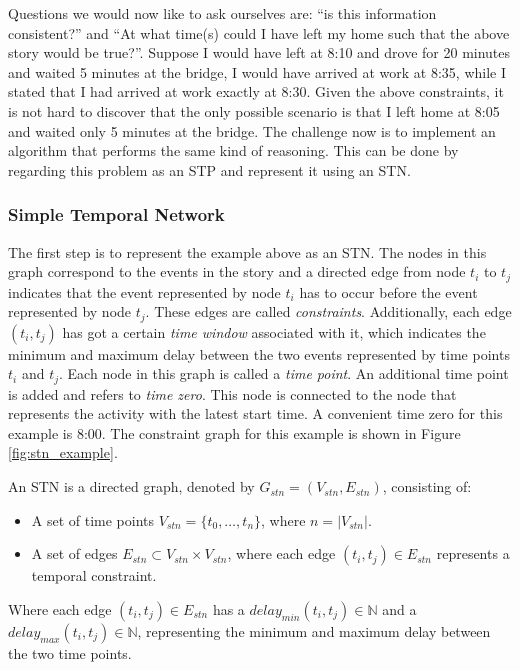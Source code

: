 \documentclass{article}
\theoremstyle{definition}
\newcommand{\mindelay}[2]{\ensuremath{delay_{min}(t_{#1}, t_{#2})}} %
\newcommand{\maxdelay}[2]{\ensuremath{delay_{max}(t_{#1}, t_{#2})}} %
\newenvironment{definition}[1][Definition]{\begin{trivlist}
\item[\hskip \labelsep {\bfseries #1}]}{\end{trivlist}}
\begin{document}
Questions we would now like to ask ourselves are: ``is this information consistent?'' and ``At what time(s) could I have left my home such that the above story would be true?''. 
Suppose I would have left at 8:10 and drove for 20 minutes and waited 5 minutes at the bridge, I would have arrived at work at 8:35, while I stated that I had arrived at work exactly at 8:30. 
Given the above constraints, it is not hard to discover that the only possible scenario is that I left home at 8:05 and waited only 5 minutes at the bridge.
The challenge now is to implement an algorithm that performs the same kind of reasoning. 
This can be done by regarding this problem as an STP and represent it using an STN.

\subsubsection{Simple Temporal Network}
\label{text:stn_subsec}
The first step is to represent the example above as an STN. 
The nodes in this graph correspond to the events in the story and a directed edge from node $t_i$ to $t_j$ indicates that the event represented by node $t_i$ has to occur before the event represented by node $t_j$.
These edges are called \emph{constraints}.
Additionally, each edge $(t_i, t_j)$ has got a certain \emph{time window} associated with it, which indicates the minimum and maximum delay between the two events represented by time points $t_i$ and $t_j$. 
Each node in this graph is called a \emph{time point}. 
An additional time point is added and refers to \emph{time zero}.
This node is connected to the node that represents the activity with the latest start time.
A convenient time zero for this example is 8:00.
The constraint graph for this example is shown in Figure \ref{fig:stn_example}.

\begin{definition}
\label{text:stn_definition}
An STN is a directed graph, denoted by $G_{stn} = (V_{stn}, E_{stn})$, consisting of:
\begin{itemize}
\item A set of time points $V_{stn} = \{t_0, \ldots, t_n\}$, where $n = |V_{stn}|$.
\item A set of edges $E_{stn} \subset V_{stn} \times V_{stn}$, where each edge $(t_i, t_j) \in E_{stn}$ represents a temporal constraint. 
\end{itemize}
Where each edge $(t_i, t_j) \in E_{stn}$ has a $\mindelay{i}{j} \in \mathbb{N}$ and a $\maxdelay{i}{j} \in \mathbb{N}$, representing the minimum and maximum delay between the two time points.
\end{definition}
\end{document}
